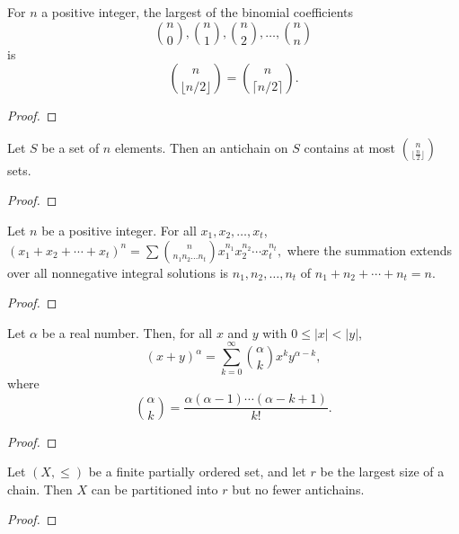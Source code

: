 \begin{corollary}
    \label{cor:5.3.2}
For \( n \) a positive integer, the largest of the binomial coefficients
\[
\binom{n}{0}, \binom{n}{1}, \binom{n}{2}, \ldots, \binom{n}{n}
\]
is
\[
\binom{n}{\lfloor n/2 \rfloor} = \binom{n}{\lceil n/2 \rceil}.
\]
\end{corollary}
\begin{proof}
\end{proof}


\begin{theorem}
    \label{thm:5.3.3}
Let \( S \) be a set of \( n \) elements. Then an antichain on \( S \) contains at most \( \binom{n}{\lfloor \frac{n}{2} \rfloor} \) sets.
\end{theorem}
\begin{proof}
\end{proof}



\begin{theorem}
    \label{thm:5.4.1}
Let \( n \) be a positive integer. For all \( x_1, x_2, \ldots, x_t \),
$
(x_1 + x_2 + \cdots + x_t)^n = \sum \binom{n}{n_1n_2\ldots n_t} x_1^{n_1} x_2^{n_2} \cdots x_t^{n_t},
$
where the summation extends over all nonnegative integral solutions is \( n_1, n_2, \ldots, n_t \) of \( n_1 + n_2 + \cdots + n_t = n \).
\end{theorem}
\begin{proof}  
\end{proof}

\begin{theorem}
    \label{thm:5.5.1}
Let \( \alpha \) be a real number. Then, for all \( x \) and \( y \) with \( 0 \leq |x| < |y| \),
\[
(x + y)^\alpha = \sum_{k=0}^{\infty} \binom{\alpha}{k} x^k y^{\alpha-k},
\]
where
\[
\binom{\alpha}{k} = \frac{\alpha(\alpha - 1) \cdots (\alpha - k + 1)}{k!}.
\]
\end{theorem}
\begin{proof} 
\end{proof}

\begin{theorem}
    \label{thm:5.6.1}
Let \((X, \leq)\) be a finite partially ordered set, and let \( r \) be the largest size of a chain. Then \( X \) can be partitioned into \( r \) but no fewer antichains.
\end{theorem}
\begin{proof}   
\end{proof}

